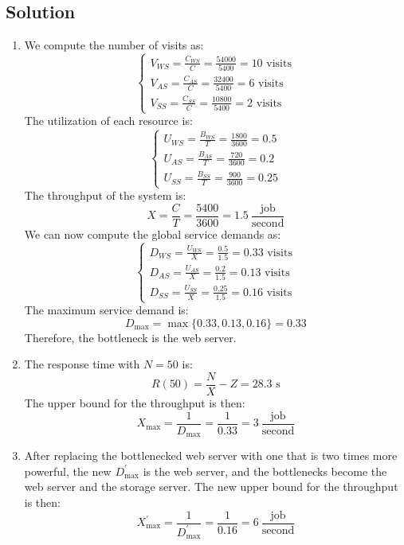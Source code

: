 \subsection*{Solution}
\begin{enumerate}
    \item We compute the number of visits as:
        \[\begin{cases}
            V_{WS}=\frac{C_{WS}}{C}=\frac{54000}{5400}=10\text{ visits} \\
            V_{AS}=\frac{C_{AS}}{C}=\frac{32400}{5400}=6\text{ visits} \\
            V_{SS}=\frac{C_{SS}}{C}=\frac{10800}{5400}=2\text{ visits} 
        \end{cases}\]
        The utilization of each resource is:
        \[\begin{cases}
            U_{WS}=\frac{B_{WS}}{T}=\frac{1800}{3600}=0.5 \\
            U_{AS}=\frac{B_{AS}}{T}=\frac{720}{3600}=0.2\\
            U_{SS}=\frac{B_{SS}}{T}=\frac{900}{3600}=0.25
        \end{cases}\]
        The throughput of the system is:
        \[X=\dfrac{C}{T}=\dfrac{5400}{3600}=1.5\:\dfrac{\text{job}}{\text{second}}\]
        We can now compute the global service demands as:
        \[\begin{cases}
            D_{WS}=\frac{U_{WS}}{X}=\frac{0.5}{1.5}=0.33\text{ visits} \\
            D_{AS}=\frac{U_{AS}}{X}=\frac{0.2}{1.5}=0.13\text{ visits} \\
            D_{SS}=\frac{U_{SS}}{X}=\frac{0.25}{1.5}=0.16\text{ visits} 
        \end{cases}\]
        The maximum service demand is:
        \[D_{\max}=\max\{0.33,0.13,0.16\}=0.33\]
        Therefore, the bottleneck is the web server.
    \item The response time with $N=50$ is:
        \[R(50)=\dfrac{N}{X}-Z=28.3\text{ s}\]
        The upper bound for the throughput is then:
        \[X_{\max}=\dfrac{1}{D_{\max}}=\dfrac{1}{0.33}=3\:\dfrac{\text{job}}{\text{second}}\]
    \item After replacing the bottlenecked web server with one that is two times more powerful, the new $D_{\max}^\prime$ is the web server, and the bottlenecks become the web server and the storage server. 
        The new upper bound for the throughput is then:
        \[X_{\max}^\prime=\dfrac{1}{D_{\max}^\prime}=\dfrac{1}{0.16}=6\:\dfrac{\text{job}}{\text{second}}\]
\end{enumerate}
